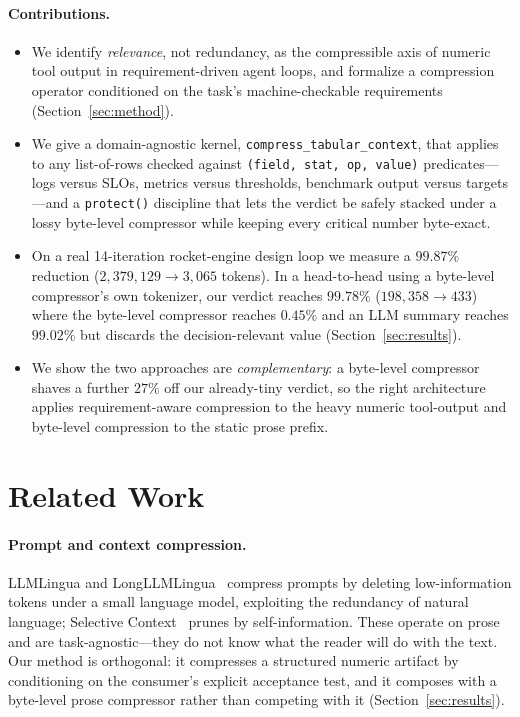 \documentclass[10pt,twocolumn]{article}
\begin{document}
\paragraph{Contributions.}
\begin{itemize}\setlength\itemsep{1pt}
\item We identify \emph{relevance}, not redundancy, as the compressible axis of
numeric tool output in requirement-driven agent loops, and formalize a compression
operator conditioned on the task's machine-checkable requirements
(Section~\ref{sec:method}).
\item We give a domain-agnostic kernel,
\texttt{compress\_tabular\_context}, that applies to any list-of-rows checked
against \texttt{(field, stat, op, value)} predicates---logs versus SLOs, metrics
versus thresholds, benchmark output versus targets---and a \texttt{protect()}
discipline that lets the verdict be safely stacked under a lossy byte-level
compressor while keeping every critical number byte-exact.
\item On a real 14-iteration rocket-engine design loop we measure a $99.87\%$
reduction ($2{,}379{,}129\!\to\!3{,}065$ tokens). In a head-to-head using a
byte-level compressor's own tokenizer, our verdict reaches $99.78\%$
($198{,}358\!\to\!433$) where the byte-level compressor reaches $0.45\%$ and an
LLM summary reaches $99.02\%$ but discards the decision-relevant value
(Section~\ref{sec:results}).
\item We show the two approaches are \emph{complementary}: a byte-level
compressor shaves a further $27\%$ off our already-tiny verdict, so the right
architecture applies requirement-aware compression to the heavy numeric
tool-output and byte-level compression to the static prose prefix.
\end{itemize}

\section{Related Work}
\label{sec:related}

\paragraph{Prompt and context compression.}
LLMLingua and LongLLMLingua~\cite{jiang2023llmlingua,jiang2024longllmlingua}
compress prompts by deleting low-information tokens under a small language model,
exploiting the redundancy of natural language; Selective
Context~\cite{li2023selective} prunes by self-information. These operate on prose
and are task-agnostic---they do not know what the reader will do with the text.
Our method is orthogonal: it compresses a structured numeric artifact by
conditioning on the consumer's explicit acceptance test, and it composes with a
byte-level prose compressor rather than competing with it
(Section~\ref{sec:results}).
\end{document}
